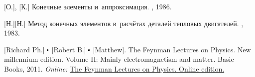 \begin{thebibliography}{123}
\begin{otherlanguage}{russian}
%
%



[О.], [К.] Конечные элементы и~аппроксимация. \mirpublisher, 1986. 

[Н.][Н.] Метод конечных элементов в~расчётах деталей тепловых двигателей. \maschinenbauleningraderverlag, 1983. 

%
%




[Richard Ph.] ${\hspace{-0.2ex}\bigdot}$ [Robert B.] ${\hspace{-0.2ex}\bigdot}$ [Matthew]. The Feynman Lectures on Physics. New millennium edition. Volume II: Mainly electromagnetism and matter. Basic Books, 2011. 
\emph{Online:}
\href{http://www.feynmanlectures.caltech.edu/}{The Feynman Lectures on Physics. Online edition.}


\end{otherlanguage}
\end{thebibliography}

